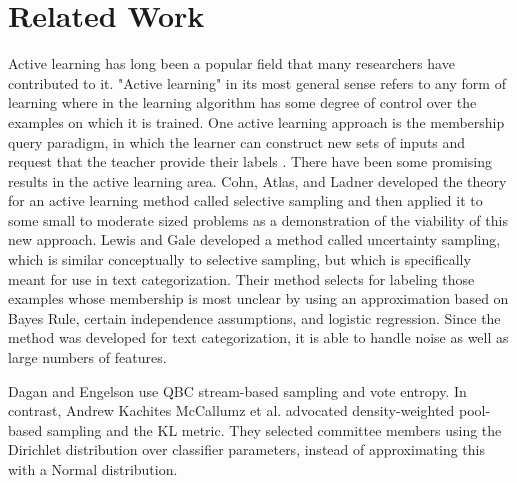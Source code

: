 \documentclass{acmtog}
\begin{document}
\section{Related Work }
\label{sec:relatedwork}
Active learning has long been a popular field that many researchers have contributed to it. 
"Active learning" in its most general sense refers to any form of learning where in the learning algorithm has some degree of control over the examples on which it is trained. One active learning approach is the membership query paradigm, in which the learner can construct new sets of inputs and request that the teacher provide their labels \cite{liere1997active}. 
There have been some promising results in the active learning area. Cohn, Atlas, and Ladner developed the theory for an active learning method called selective sampling and then applied it to some small to moderate sized problems as a demonstration of the viability of this new approach\cite{cohn1994improving}. Lewis and Gale developed a method called uncertainty sampling, which is similar conceptually to selective sampling, but which is specifically meant for use in text categorization. Their method selects for labeling those examples whose membership is most unclear by using an approximation based on Bayes Rule, certain independence assumptions, and logistic regression. Since the method was developed for text categorization, it is able to handle noise as well as large numbers of features\cite{lewis1994sequential}.

Dagan and Engelson use QBC stream-based sampling and vote entropy. In contrast, Andrew Kachites McCallumz et al. advocated density-weighted pool-based sampling and the KL metric.\cite{mccallumzy1998employing}  They selected committee
members using the Dirichlet distribution over classifier parameters, instead of approximating this with a Normal distribution. 


\end{document}
